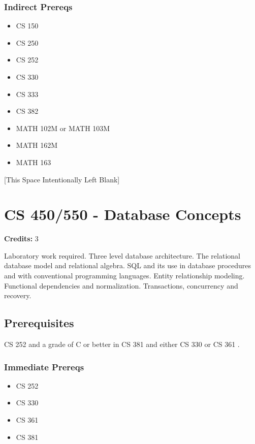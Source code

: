 \documentclass[]{article}
\providecommand{\tightlist}{%
  \setlength{\itemsep}{0pt}\setlength{\parskip}{0pt}}
\newcommand{\pagebreakhere}{
\vspace*{\fill}
\begin{center}
[This Space Intentionally Left Blank]
\end{center}
\vspace*{\fill}
\newpage
}
\begin{document}
\subsubsection{Indirect Prereqs}\label{indirect-prereqs-24}

\begin{itemize}
\tightlist
\item
  CS 150
\item
  CS 250
\item
  CS 252
\item
  CS 330
\item
  CS 333
\item
  CS 382
\item
  MATH 102M or MATH 103M
\item
  MATH 162M
\item
  MATH 163
\end{itemize}

\pagebreakhere
\section{CS 450/550 - Database
Concepts}\label{cs-450550---database-concepts}

\textbf{Credits:} 3

Laboratory work required. Three level database architecture. The
relational database model and relational algebra. SQL and its use in
database procedures and with conventional programming languages. Entity
relationship modeling. Functional dependencies and normalization.
Transactions, concurrency and recovery.

\subsection{Prerequisites}\label{prerequisites-33}

CS 252 and a grade of C or better in CS 381 and either CS 330 or CS 361
.

\subsubsection{Immediate Prereqs}\label{immediate-prereqs-25}

\begin{itemize}
\tightlist
\item
  CS 252
\item
  CS 330
\item
  CS 361
\item
  CS 381
\end{itemize}
\end{document}
